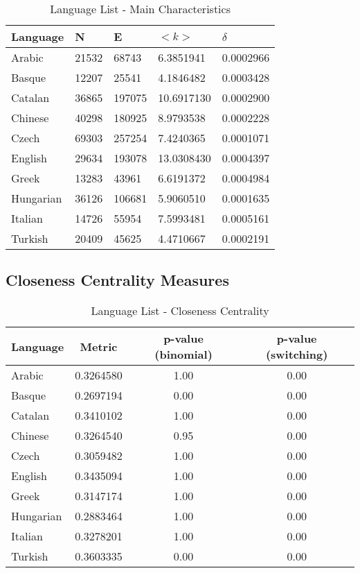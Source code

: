 \documentclass[12pt, a4paper]{article}
\begin{document}
\begin{table}[H]
    \centering
    \begin{tabular}{l l l l l}
    Language & N & E & $<k>$ & $\delta$ \\
     \hline
    Arabic & 21532 & 68743 & 6.3851941 & 0.0002966 \\
    Basque & 12207 & 25541 & 4.1846482 & 0.0003428 \\
    Catalan & 36865 & 197075 & 10.6917130 & 0.0002900 \\
    Chinese & 40298 & 180925 & 8.9793538 & 0.0002228 \\
    Czech & 69303 & 257254 & 7.4240365 & 0.0001071 \\
    English & 29634 & 193078 & 13.0308430 & 0.0004397 \\
    Greek & 13283 & 43961 & 6.6191372 & 0.0004984 \\
    Hungarian & 36126 & 106681 & 5.9060510 & 0.0001635 \\
    Italian & 14726 & 55954 & 7.5993481 & 0.0005161 \\
    Turkish & 20409 & 45625 & 4.4710667 & 0.0002191 \\
    \end{tabular}
   \caption{Language List - Main Characteristics}
   \label{table:1}
\end{table}

\subsection{Closeness Centrality Measures}

\begin{table}[H]
  \centering
  \begin{tabular}{l c c c}
  Language & Metric & p-value (binomial) & p-value (switching)\\
   \hline
   Arabic & 0.3264580  & 1.00 & 0.00 \\
   Basque & 0.2697194  & 0.00 & 0.00 \\
   Catalan & 0.3410102 & 1.00 & 0.00 \\
   Chinese & 0.3264540 & 0.95& 0.00 \\
   Czech & 0.3059482 & 1.00 & 0.00 \\
   English & 0.3435094  & 1.00 & 0.00 \\
   Greek & 0.3147174  & 1.00 & 0.00 \\
   Hungarian & 0.2883464 & 1.00 & 0.00 \\
   Italian & 0.3278201 & 1.00 & 0.00 \\
   Turkish & 0.3603335  & 0.00 & 0.00 \\
     \end{tabular}
 \caption{Language List - Closeness Centrality}
 \label{table:2}
\end{table}
\end{document}
